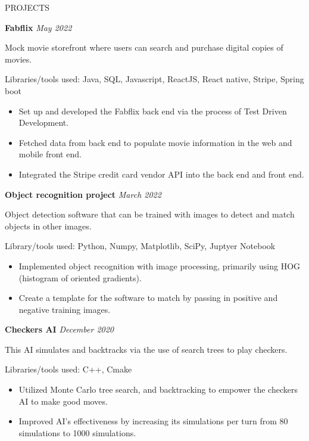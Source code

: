\documentclass{ResumeFormat} %
\begin{document}
\begin{rSection}{PROJECTS}
\vspace{-1em}

\item \textbf{Fabflix} {} \hfill {\emph{May 2022}} %

Mock movie storefront where users can search and purchase digital copies of movies.

Libraries/tools used: Java, SQL, Javascript, ReactJS, React native, Stripe, Spring boot
\begin{itemize}
    \itemsep -3pt {}
     \item Set up and developed the Fabflix back end via the process of Test Driven Development.
     \item Fetched data from back end to populate movie information in the web and mobile front end.
     \item Integrated the Stripe credit card vendor API into the back end and front end.
 \end{itemize}

 \item \textbf{Object recognition project} {} \hfill {\emph{March 2022}}

Object detection software that can be trained with images to detect and match objects in other images.

Library/tools used: Python, Numpy, Matplotlib, SciPy, Juptyer Notebook
\begin{itemize}
    \itemsep -3pt {} 
     \item Implemented object recognition with image processing, primarily using HOG (histogram of oriented gradients).
     \item Create a template for the software to match by passing in positive and negative training images.
 \end{itemize}

 \item \textbf{Checkers AI} {} \hfill {\emph{December 2020}}

This AI simulates and backtracks via the use of search trees to play checkers.

Libraries/tools used: C++, Cmake
\begin{itemize}
    \itemsep -3pt {}
     \item Utilized Monte Carlo tree search, and backtracking to empower the checkers AI to make good moves.
     \item Improved AI's effectiveness by increasing its simulations per turn from 80 simulations to 1000 simulations.
 \end{itemize}


\end{rSection}
\end{document}
